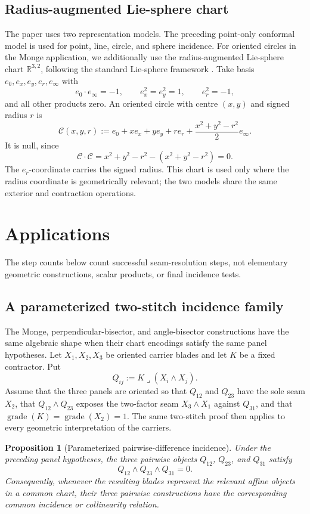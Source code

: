 \documentclass[11pt]{article}
\newtheorem{proposition}{Proposition}
\begin{document}
\subsection{Radius-augmented Lie-sphere chart}

The paper uses two representation models. The preceding point-only conformal
model is used for point, line, circle, and sphere incidence. For oriented
circles in the Monge application, we additionally use the radius-augmented
Lie-sphere chart
\(\mathbb R^{3,2}\), following the standard Lie-sphere framework
\cite{cecil1992}. Take basis
\(e_0,e_x,e_y,e_r,e_\infty\) with
\[
 e_0\cdot e_\infty=-1,\qquad
 e_x^2=e_y^2=1,\qquad e_r^2=-1,
\]
and all other products zero. An oriented circle with centre \((x,y)\) and
signed radius \(r\) is
\[
 \mathcal C(x,y,r)
 :=e_0+x e_x+y e_y+r e_r
   +\frac{x^2+y^2-r^2}{2}e_\infty .
\]
It is null, since
\[
 \mathcal C\cdot\mathcal C
 =x^2+y^2-r^2-(x^2+y^2-r^2)=0.
\]
The \(e_r\)-coordinate carries the signed radius. This chart is used only
where the radius coordinate is geometrically relevant; the two models share
the same exterior and contraction operations.

\section{Applications}

The step counts below count successful seam-resolution steps, not elementary
geometric constructions, scalar products, or final incidence tests.

\subsection{A parameterized two-stitch incidence family}

The Monge, perpendicular-bisector, and angle-bisector constructions have the
same algebraic shape when their chart encodings satisfy the same panel
hypotheses. Let \(X_1,X_2,X_3\) be oriented carrier blades and let \(K\) be a
fixed contractor. Put
\[
Q_{ij}:=K\mathbin{\lrcorner}(X_i\wedge X_j).
\]
Assume that the three panels are oriented so that \(Q_{12}\) and \(Q_{23}\)
have the sole seam \(X_2\), that \(Q_{12}\wedge Q_{23}\) exposes the
two-factor seam \(X_3\wedge X_1\) against \(Q_{31}\), and that
\(\operatorname{grade}(K)=\operatorname{grade}(X_2)=1\). The same two-stitch
proof then applies to every
geometric interpretation of the carriers.

\begin{proposition}[Parameterized pairwise-difference incidence]
\label{prop:pairwise-difference}
Under the preceding panel hypotheses, the three pairwise objects \(Q_{12}\),
\(Q_{23}\), and \(Q_{31}\) satisfy
\[
Q_{12}\wedge Q_{23}\wedge Q_{31}=0.
\]
Consequently, whenever the resulting blades represent the relevant affine
objects in a common chart, their three pairwise constructions have the
corresponding common incidence or collinearity relation.
\end{proposition}
\end{document}
